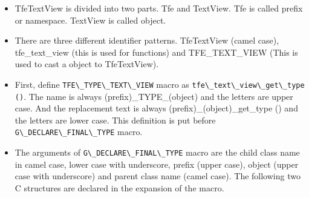 \begin{itemize}
\tightlist
\item
  TfeTextView is divided into two parts. Tfe and TextView. Tfe is called
  prefix or namespace. TextView is called object.
\item
  There are three different identifier patterns. TfeTextView (camel
  case), tfe\_text\_view (this is used for functions) and
  TFE\_TEXT\_VIEW (This is used to cast a object to TfeTextView).
\item
  First, define \passthrough{\lstinline!TFE\_TYPE\_TEXT\_VIEW!} macro as
  \passthrough{\lstinline!tfe\_text\_view\_get\_type ()!}. The name is
  always (prefix)\_TYPE\_(object) and the letters are upper case. And
  the replacement text is always (prefix)\_(object)\_get\_type () and
  the letters are lower case. This definition is put before
  \passthrough{\lstinline!G\_DECLARE\_FINAL\_TYPE!} macro.
\item
  The arguments of \passthrough{\lstinline!G\_DECLARE\_FINAL\_TYPE!}
  macro are the child class name in camel case, lower case with
  underscore, prefix (upper case), object (upper case with underscore)
  and parent class name (camel case). The following two C structures are
  declared in the expansion of the macro.


\end{itemize}
